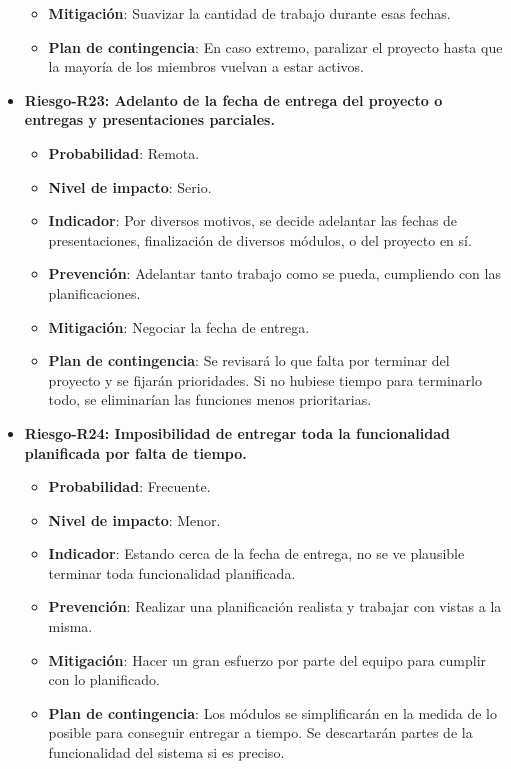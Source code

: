 \begin{itemize}
\begin{itemize}
		\item{ \bf Mitigación}: Suavizar la cantidad de trabajo durante esas fechas.
		\item{ \bf Plan de contingencia}: En caso extremo, paralizar el proyecto hasta que la mayoría de los miembros vuelvan a estar activos.\\
		\end{itemize}
\item { \bf Riesgo-R23: Adelanto de la fecha de entrega del proyecto o entregas y presentaciones parciales.}
		\begin{itemize}	
		\item{ \bf Probabilidad}: Remota.
		\item{ \bf Nivel de impacto}: Serio.
		\item{ \bf Indicador}: Por diversos motivos, se decide adelantar las fechas de presentaciones, finalización de diversos módulos, o del proyecto en sí.
		\item{ \bf Prevención}: Adelantar tanto trabajo como se pueda, cumpliendo con las planificaciones.
		\item{ \bf Mitigación}: Negociar la fecha de entrega.
		\item{ \bf Plan de contingencia}: Se revisará lo que falta por terminar del proyecto y se fijarán prioridades. Si no hubiese tiempo para terminarlo todo, se eliminarían las funciones menos prioritarias.\\
		\end{itemize}
\item { \bf Riesgo-R24: Imposibilidad de entregar toda la funcionalidad planificada por falta de tiempo.}
		\begin{itemize}	
		\item{ \bf Probabilidad}: Frecuente.
		\item{ \bf Nivel de impacto}: Menor.
		\item{ \bf Indicador}: Estando cerca de la fecha de entrega, no se ve plausible terminar toda funcionalidad planificada.
		\item{ \bf Prevención}: Realizar una planificación realista y trabajar con vistas a la misma.
		\item{ \bf Mitigación}: Hacer un gran esfuerzo por parte del equipo para cumplir con lo planificado.
		\item{ \bf Plan de contingencia}: Los módulos se simplificarán en la medida de lo posible para conseguir entregar a tiempo. Se descartarán partes de la funcionalidad del sistema si es preciso.\\

\end{itemize}
\end{itemize}
